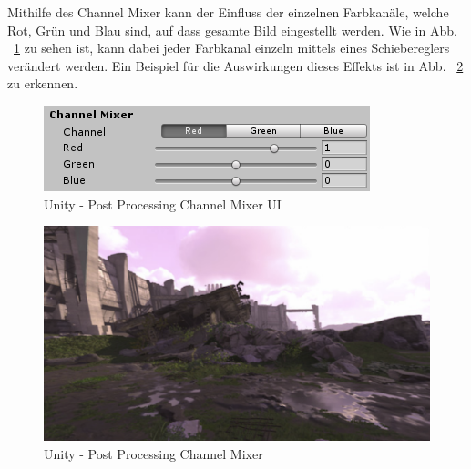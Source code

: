 Mithilfe des Channel Mixer kann der Einfluss der einzelnen Farbkanäle, welche Rot, Grün und Blau sind, auf dass gesamte Bild eingestellt werden.
Wie in Abb. ~\ref{fig:unity-post-processing-channel-mixer-ui} zu sehen ist, kann dabei jeder Farbkanal einzeln mittels eines Schiebereglers verändert werden.
Ein Beispiel für die Auswirkungen dieses Effekts ist in Abb. ~\ref{fig:unity-post-processing-channel-mixer} zu erkennen.
\begin {figure}
    \centering
    \includegraphics[scale=0.9]{pics/unity-post-processing-channel-mixer-ui}
    \caption{Unity - Post Processing Channel Mixer UI}
    \label{fig:unity-post-processing-channel-mixer-ui}
\end {figure}

\begin {figure}
    \centering
    \includegraphics[scale=0.4]{pics/unity-post-processing-channel-mixer-example}
    \caption{Unity - Post Processing Channel Mixer}
    \label{fig:unity-post-processing-channel-mixer}
\end {figure}

